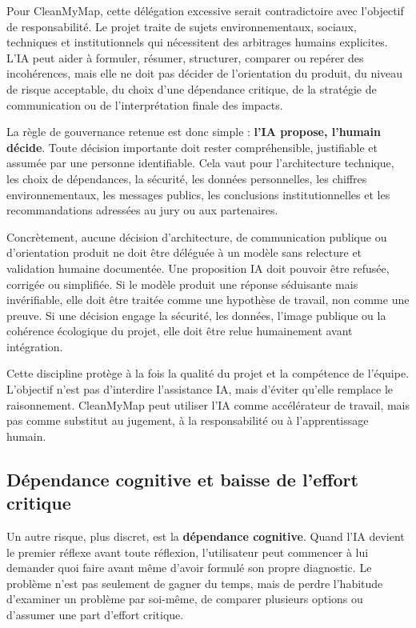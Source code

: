 \documentclass[
  10pt,
  a4paper,
  DIV=11,
  numbers=noendperiod,
  oneside]{scrreprt}
\let\oldtextbf\textbf
\renewcommand{\textbf}[1]{\oldtextbf{\textcolor{cmmnavy}{#1}}}
\begin{document}
Pour CleanMyMap, cette délégation excessive serait contradictoire avec
l'objectif de responsabilité. Le projet traite de sujets
environnementaux, sociaux, techniques et institutionnels qui nécessitent
des arbitrages humains explicites. L'IA peut aider à formuler, résumer,
structurer, comparer ou repérer des incohérences, mais elle ne doit pas
décider de l'orientation du produit, du niveau de risque acceptable, du
choix d'une dépendance critique, de la stratégie de communication ou de
l'interprétation finale des impacts.

La règle de gouvernance retenue est donc simple : \textbf{l'IA propose,
l'humain décide}. Toute décision importante doit rester compréhensible,
justifiable et assumée par une personne identifiable. Cela vaut pour
l'architecture technique, les choix de dépendances, la sécurité, les
données personnelles, les chiffres environnementaux, les messages
publics, les conclusions institutionnelles et les recommandations
adressées au jury ou aux partenaires.

Concrètement, aucune décision d'architecture, de communication publique
ou d'orientation produit ne doit être déléguée à un modèle sans
relecture et validation humaine documentée. Une proposition IA doit
pouvoir être refusée, corrigée ou simplifiée. Si le modèle produit une
réponse séduisante mais invérifiable, elle doit être traitée comme une
hypothèse de travail, non comme une preuve. Si une décision engage la
sécurité, les données, l'image publique ou la cohérence écologique du
projet, elle doit être relue humainement avant intégration.

Cette discipline protège à la fois la qualité du projet et la compétence
de l'équipe. L'objectif n'est pas d'interdire l'assistance IA, mais
d'éviter qu'elle remplace le raisonnement. CleanMyMap peut utiliser l'IA
comme accélérateur de travail, mais pas comme substitut au jugement, à
la responsabilité ou à l'apprentissage humain.

\subsection{Dépendance cognitive et baisse de l'effort
critique}\label{duxe9pendance-cognitive-et-baisse-de-leffort-critique}

Un autre risque, plus discret, est la \textbf{dépendance cognitive}.
Quand l'IA devient le premier réflexe avant toute réflexion,
l'utilisateur peut commencer à lui demander quoi faire avant même
d'avoir formulé son propre diagnostic. Le problème n'est pas seulement
de gagner du temps, mais de perdre l'habitude d'examiner un problème par
soi-même, de comparer plusieurs options ou d'assumer une part d'effort
critique.
\end{document}
